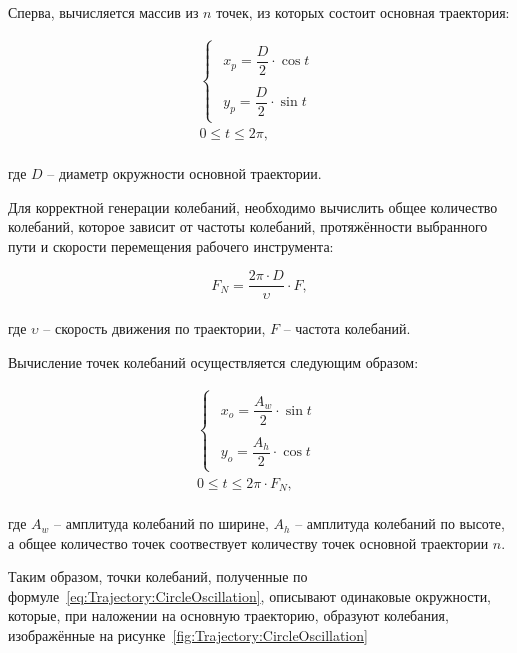 Сперва, вычисляется массив из $n$ точек, из которых состоит основная траектория:

\begin{gather}
    \label{eq:Trajectory:CirclePath}
    \begin{cases}
        \begin{aligned}
            x_p = \dfrac{D}{2} \cdot \cos t \\
            \\
            y_p = \dfrac{D}{2} \cdot \sin t
        \end{aligned}
    \end{cases} \\
    \nonumber
    0 \leq t \leq 2 \pi,
\end{gather} \\
где $D$ -- диаметр окружности основной траектории.

Для корректной генерации колебаний, необходимо вычислить общее количество колебаний, которое зависит от частоты колебаний, протяжённости выбранного пути и скорости перемещения рабочего инструмента:

\begin{equation*}
    F_N = \dfrac{2 \pi \cdot D}{\upsilon} \cdot F,
\end{equation*} \\
где $\upsilon$ -- скорость движения по траектории, $F$ -- частота колебаний.

Вычисление точек колебаний осуществляется следующим образом:

\begin{gather}
    \begin{cases}
        \label{eq:Trajectory:CircleOscillation}
        \begin{aligned}
            x_o = \dfrac{A_w}{2} \cdot \sin t \\
            \\
            y_o = \dfrac{A_h}{2} \cdot \cos t
        \end{aligned}
    \end{cases} \\
    \nonumber
    0 \leq t \leq 2 \pi \cdot F_N,
\end{gather} \\
где $A_w$ -- амплитуда колебаний по ширине, $A_h$ -- амплитуда колебаний по высоте, а общее количество точек соотвествует количеству точек основной траектории $n$.

Таким образом, точки колебаний, полученные по формуле~\ref{eq:Trajectory:CircleOscillation}, описывают одинаковые окружности, которые, при наложении на основную траекторию, образуют колебания, изображённые на рисунке~\ref{fig:Trajectory:CircleOscillation}

